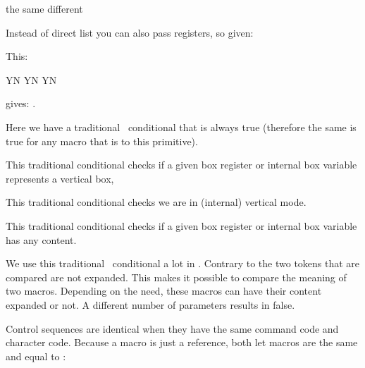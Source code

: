 \starttyping
{}
    the same
\else
    different
\fi
\stoptyping

Instead of direct list you can also pass registers, so given:

\startbuffer[a]
%
%
\stopbuffer

\typebuffer[a]

This:

\startbuffer[b]
 \scratchtoks          Y\else N\fi\space
{}\scratchtoks          Y\else N\fi\space
\iftok\scratchtoks\scratchtoks Y\else N\fi
\stopbuffer

\typebuffer[b]

{\getbuffer[a]gives: \inlinebuffer[b].}

\stopnewprimitive

\startoldprimitive[title={\prm {iftrue}}]

Here we have a traditional \TEX\ conditional that is always true (therefore the
same is true for any macro that is  to this primitive).

\stopoldprimitive

\startoldprimitive[title={\prm {ifvbox}}]

This traditional conditional checks if a given box register or internal box
variable represents a vertical box,

\stopoldprimitive

\startoldprimitive[title={\prm {ifvmode}}]

This traditional conditional checks we are in (internal) vertical mode.

\stopoldprimitive

\startoldprimitive[title={\prm {ifvoid}}]

This traditional conditional checks if a given box register or internal box
variable has any content.

\stopoldprimitive

\startoldprimitive[title={\prm {ifx}}]

We use this traditional \TEX\ conditional a lot in \CONTEXT. Contrary to 
the two tokens that are compared are not expanded. This makes it possible to compare
the meaning of two macros. Depending on the need, these macros can have their content
expanded or not. A different number of parameters results in false.

Control sequences are identical when they have the same command code and
character code. Because a  macro is just a reference, both let macros
are the same and equal to :

